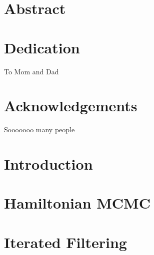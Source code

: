 \documentclass[12pt, twoside]{report}
\makeatletter
\let\org@subfile
\renewcommand*{}[1]{%
  \filename@parse{#1}%
  \expandafter
  \graphicspath\expandafter{\expandafter{\filename@area}}%
  \org@subfile{#1}%
}
\makeatother
\begin{document}

	


	\newpage

	\chapter*{Abstract}

		\lipsum[1]

	\chapter*{Dedication}

		To Mom and Dad

	\chapter*{Acknowledgements}

		Sooooooo many people

	\tableofcontents

	\listoffigures


	\newpage

	\chapter{Introduction}

		

	\chapter{Hamiltonian MCMC}

		

	\chapter{Iterated Filtering}

		\graphicspath{{../PF-IF2/}}
		
\end{document}
